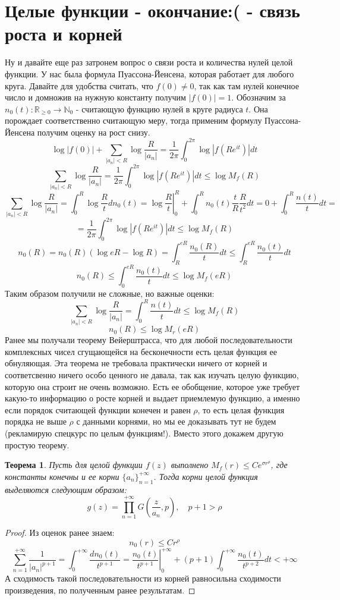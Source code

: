 \documentclass[12pt,a4paper]{article} %
\newtheorem{theorem}{Теорема}
\newcommand{\R}{\mathbb{R}}
\begin{document}
	\section{Целые функции - окончание:( - связь роста и корней}
	Ну и давайте еще раз затронем вопрос о связи роста и количества нулей целой функции. У нас была формула Пуассона-Йенсена, которая работает для любого круга. Давайте для удобства считать, что $f(0)\neq0$, так как там нулей конечное число и домножив на нужную константу получим $|f(0)|=1$. Обозначим за $n_0(t):\R_{\geq0}\rightarrow\mathbb{N}_0$ - считающую функцию нулей в круге радиуса $t$. Она порождает соответственно считающую меру, тогда применим формулу Пуассона-Йенсена получим оценку на рост снизу.
	$$\log |f(0)|+\sum_{|a_n|<R}\log \frac{R}{|a_n|}=\frac{1}{2\pi}\int_0^{2\pi}\log|f(Re^{it})|dt$$
	$$\sum_{|a_n|<R}\log \frac{R}{|a_n|}=\frac{1}{2\pi}\int_0^{2\pi}\log|f(Re^{it})|dt\leq\log M_f(R)$$
	$$\sum_{|a_n|<R}\log \frac{R}{|a_n|}=\int_0^R\log\frac{R}{t}dn_0(t)=\left.\log\frac{R}{t}\right|_0^R+\int_0^Rn_0(t)\frac{t}{R}\frac{R}{t^2}dt=0+\int_0^R\frac{n(t)}{t}dt=$$
	$$=\frac{1}{2\pi}\int_0^{2\pi}\log|f(Re^{it})|dt\leq\log M_f(R)$$
	$$n_0(R)=n_0(R)(\log eR-\log R)=\int_R^{eR}\frac{n_0(R)}{t}dt\leq\int_R^{eR}\frac{n_0(t)}{t}dt$$
	$$n_0(R)\leq\int_0^{eR}\frac{n_0(t)}{t}dt\leq\log M_f(eR)$$
	Таким образом получили не сложные, но важные оценки:
	$$\sum_{|a_n|<R}\log \frac{R}{|a_n|}=\int_0^R\frac{n(t)}{t}dt\leq\log M_f(R)$$
	$$n_0(R)\leq\log M_r(eR)$$
	Ранее мы получали теорему Вейерштрасса, что для любой последовательности комплексных чисел сгущающейся на бесконечности есть целая функция ее обнуляющая. Эта теорема не требовала практически ничего от корней и соответсвенно ничего особо ценного не давала, так как изучать целую функцию, которую она строит не очень возможно. Есть ее обобщение, которое уже требует какую-то информацию о росте корней и выдает приемлемую функцию, а именно если порядок считающей функции конечен и равен $\rho$, то есть целая функция порядка не выше $\rho$ с данными корнями, но мы ее доказывать тут не будем (рекламирую спецкурс по целым функциям!). Вместо этого докажем другую простую теорему.
	\begin{theorem}
		Пусть для целой функции $f(z)$ выполнено $M_f(r)\leq Ce^{\sigma r^{\rho}}$, где константы конечны и ее корни $\{a_n\}_{n=1}^{+\infty}$. Тогда корни целой функция выделяются следующим образом:
		$$g(z)=\prod_{n=1}^{+\infty}G\left(\frac{z}{a_n},p\right),\quad p+1>\rho$$
	\end{theorem}
	\begin{proof}
		Из оценок ранее знаем:
		$$n_0(r)\leq Cr^{\rho}$$
		$$\sum_{n=1}^{+\infty}\frac{1}{|a_n|^{p+1}}=\int_0^{+\infty}\frac{dn_0(t)}{t^{p+1}}=\left.\frac{n_0(t)}{t^{p+1}}\right|_0^{+\infty}+(p+1)\int_0^{+\infty}\frac{n_0(t)}{t^{p+2}}dt<+\infty$$
		А сходимость такой последовательности из корней равносильна сходимости произведения, по полученным ранее результатам.
	\end{proof}
\end{document}
